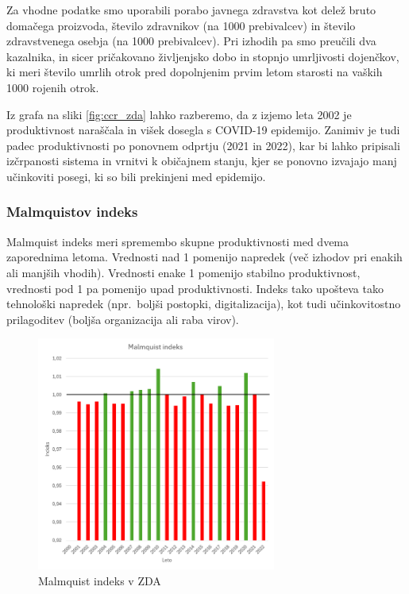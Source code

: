 \documentclass[12pt,a4paper]{article}
\theoremstyle{definition}
\begin{document}
Za vhodne podatke smo uporabili porabo javnega zdravstva kot delež bruto domačega proizvoda, 
število zdravnikov (na 1000 prebivalcev) in število zdravstvenega osebja (na 1000 prebivalcev). 
Pri izhodih pa smo preučili dva kazalnika, in sicer pričakovano življenjsko dobo in stopnjo umrljivosti dojenčkov, 
ki meri število umrlih otrok pred dopolnjenim prvim letom starosti na vaških 1000 rojenih otrok.

Iz grafa na sliki \ref{fig:ccr_zda} lahko razberemo, da z izjemo leta 2002 je produktivnost
naraščala in višek dosegla s COVID-19 epidemijo. Zanimiv je tudi padec produktivnosti po
ponovnem odprtju (2021 in 2022), kar bi lahko pripisali izčrpanosti
sistema in vrnitvi k običajnem stanju, kjer se ponovno izvajajo
manj učinkoviti posegi, ki so bili prekinjeni med epidemijo.

\subsubsection{Malmquistov indeks}

Malmquist indeks meri spremembo skupne produktivnosti med dvema zaporednima letoma. Vrednosti
nad 1 pomenijo napredek (več izhodov pri enakih ali manjših vhodih). Vrednosti enake 1 pomenijo stabilno produktivnost,
vrednosti pod 1 pa pomenijo upad produktivnosti. Indeks tako upošteva tako tehnološki napredek (npr.\ boljši postopki, digitalizacija),
kot tudi učinkovitostno prilagoditev (boljša organizacija ali raba virov).

\begin{figure}[H]
    \centering
    \includegraphics[width=0.7\textwidth]{zda_malmquist_indeks.png}
    \caption{Malmquist indeks v ZDA}
    \label{fig:zda_malmquist_indeks}
\end{figure}
\end{document}
